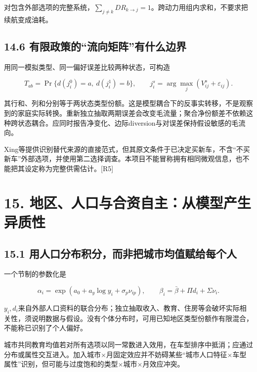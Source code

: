 \documentclass[
  11pt,
]{article}
\begin{document}
对包含外部选项的完整系统，\(\sum_{j\ne k}DR_{k\to j}=1\)。跨动力用组内求和，不要求把续航变成油耗。

\subsection{14.6
有限政策的``流向矩阵''有什么边界}\label{ux6709ux9650ux653fux7b56ux7684ux6d41ux5411ux77e9ux9635ux6709ux4ec0ux4e48ux8fb9ux754c}

用同一模拟类型、同一偏好误差比较两种状态，可构造

\[
T_{ab}=\Pr\{d(j_i^0)=a,\ d(j_i^1)=b\},\qquad
j_i^s=\arg\max_j(V_{ij}^s+\varepsilon_{ij}). \tag{66}
\]

其行和、列和分别等于两状态类型份额。这是模型耦合下的反事实转移，不是观察到的家庭实际转换。重新独立抽取两期误差会改变毛流量；聚合净份额差不依赖这种跨状态耦合。应同时报告净变化、边际diversion与对误差保持假设敏感的毛流向。

Xing等提供识别替代来源的直接范式，但其原文条件于已决定买新车，不含``不买新车''外部选项，并使用第二选择调查。本项目不能冒称拥有相同微观信息，也不能把其设定称为完整供需估计。{[}R5{]}

\section{15.
地区、人口与合资自主：从模型产生异质性}\label{ux5730ux533aux4ebaux53e3ux4e0eux5408ux8d44ux81eaux4e3bux4eceux6a21ux578bux4ea7ux751fux5f02ux8d28ux6027}

\subsection{15.1
用人口分布积分，而非把城市均值赋给每个人}\label{ux7528ux4ebaux53e3ux5206ux5e03ux79efux5206ux800cux975eux628aux57ceux5e02ux5747ux503cux8d4bux7ed9ux6bcfux4e2aux4eba}

一个节制的参数化是

\[
\alpha_i=\exp(a_0+a_y\log y_i+\sigma_p\nu_{ip}),\qquad
\beta_i=\bar\beta+\Pi d_i+\Sigma\nu_i.
\tag{67}
\]

\(y_i,d_i\)来自外部人口资料的联合分布；独立抽取收入、教育、住房等会破坏实际相关性，须说明数据与假设。没有个体分布时，可用已知地区类型份额作有限混合，不能称已识别了个人偏好。

城市共同教育均值若对所有选项以同一常数进入效用，在车型排序中抵消；应通过分布或属性交互进入。加入城市×月固定效应并不妨碍某些``城市人口特征×车型属性''识别，但可能与过度饱和的类型×城市×月效应冲突。
\end{document}
